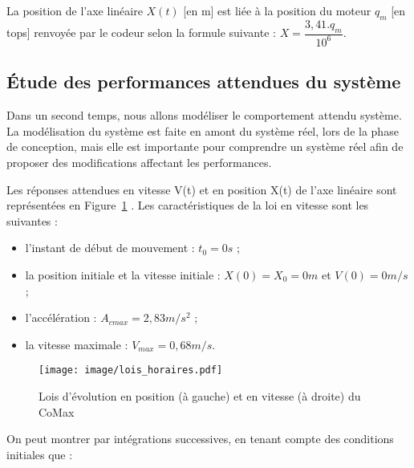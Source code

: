 \vspace{5mm}
La position de l'axe linéaire $X(t)$ [en m] est liée à la position du moteur $q_m$ [en tops] renvoyée par le codeur selon la formule suivante : $X = \dfrac{3,41.q_m}{10^6}$. 

\vspace{5mm}

\vspace{5mm}

\subsection{Étude des performances attendues du système}
Dans un second temps, nous allons modéliser le comportement attendu système. La modélisation du système est faite en amont du système réel, lors de la phase de conception, mais elle est importante pour comprendre un système réel afin de proposer des modifications affectant les performances.

Les réponses attendues en vitesse V(t) et en position X(t) de l’axe linéaire sont représentées en Figure~\ref{lois_horaires} . Les caractéristiques de la loi en vitesse sont les suivantes :
\begin{itemize}
\item l’instant de début de mouvement : $t_0=0 s$ ;
\item la position initiale et la vitesse initiale : $X(0)=X_0=0 m$ et $V(0)=0 m/s$;
\item l’accélération : $A_{cmax}=2,83 m/s^2$ ;
\item la vitesse maximale : $V_{max}=0,68 m/s$.
\end{itemize}

\begin{figure}[!h]
\centering
\texttt{[image: image/lois\_horaires.pdf]}
\caption{Lois d'évolution en position (à gauche) et en vitesse (à droite) du CoMax}
\label{lois_horaires}
\end{figure}

On peut montrer par intégrations successives, en tenant compte des conditions initiales que :

